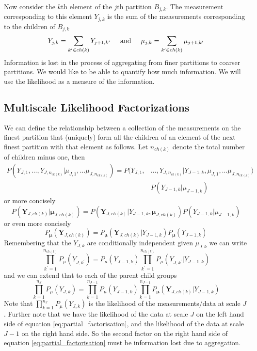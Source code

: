 \documentclass[a4paper,12pt]{article}
\theoremstyle{definition}
\begin{document}
Now consider the $k$th element of the $j$th partition $B_{j,k}$. The measurement corresponding to this element $Y_{j,k}$ is the sum of the measurements corresponding to the children of $B_{j,k}$
\begin{equation}
  Y_{j,k} = \sum_{k^\prime \in ch(k)}Y_{j+1, k^\prime} \hspace{5mm} \text{and} \hspace{5mm} \mu_{j,k} = \sum_{k^\prime \in ch(k)}\mu_{j+1, k^\prime}
\end{equation}
Information is lost in the process of aggregating from finer partitions to coarser partitions. We would like to be able to quantify how much information. We will use the likelihood as a measure of the information.

\subsection{Multiscale Likelihood Factorizations}
We can define the relationship between a collection of the measurements on the finest partition that (uniquely) form all the children of an element of the next finest partition with that element as follows. Let $n_{ch(k)}$ denote the total number of children minus one, then
\begin{align*}
  P(Y_{J,1}, \dots, Y_{J,n_{ck(k)}} | \mu_{J,1}, \dots \mu_{J, n_{ck(k)}}) = P(Y_{J,1}, &\dots, Y_{J,n_{ck(k)}} | Y_{J-1,k}, \mu_{J,1}, \dots \mu_{J, n_{ck(k)}}) \\
    &P(Y_{J-1,k} | \mu_{J-1,k})
\end{align*}
or more concisely
\begin{equation}
  P(\mathbf{Y}_{J,ch(k)} | \boldsymbol{\mu}_{J,ch(k)}) = P(\mathbf{Y}_{J,ch(k)} | Y_{J-1,k}, \boldsymbol{\mu}_{J,ch(k)}) P(Y_{J-1,k} | \mu_{J-1,k})
\end{equation}
or even more concisely
\begin{equation}
  P_{\boldsymbol{\mu}}(\mathbf{Y}_{J,ch(k)}) = P_{\boldsymbol{\mu}}(\mathbf{Y}_{J,ch(k)} | Y_{J-1,k}) P_{\boldsymbol{\mu}}(Y_{J-1,k})
\end{equation}
Remembering that the $Y_{J,k}$ are conditionally independent given $\mu_{J,k}$ we can write
\begin{equation}
  \prod_{k^\prime=1}^{n_{ch(k)}} P_\mu(Y_{J,k^\prime}) = P_\mu(Y_{J-1,k}) \prod_{k^\prime=1}^{n_{ch(k)}} P_\mu(Y_{J,k^\prime} | Y_{J-1,k})
\end{equation}
and we can extend that to each of the parent child groups
\begin{equation}\label{eq:partial_factorisation}
  \prod_{k=1}^{n_J} P_{\mu}(Y_{J,k}) = \prod_{k=1}^{n_{J-1}} P_\mu(Y_{J-1,k}) \prod_{k=1}^{n_{J-1}} P_{\boldsymbol{\mu}}(\mathbf{Y}_{J,ch(k)} | Y_{J-1,k})
\end{equation}
Note that $\prod_{k=1}^{n_J}P_{\mu}(Y_{J,k})$ is the likelihood of the measurements/data at scale $J$. Further note that we have the likelihood of the data at scale $J$ on the left hand side of equation \ref{eq:partial_factorisation}, and the likelihood of the data at scale $J-1$ on the right hand side. So the second factor on the right hand side of equation \ref{eq:partial_factorisation} must be information lost due to aggregation.
\end{document}
